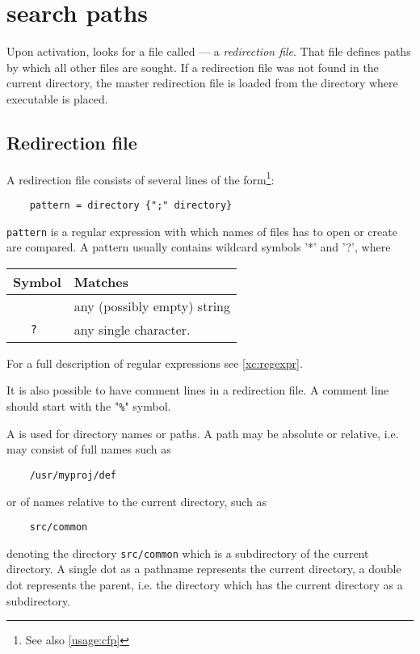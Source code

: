 \section{\XDS{} search paths}

Upon activation, \XC{} looks for a file called {\tt \red} ---
a {\em redirection file}. That file defines paths by which all
other files are sought. If a redirection file was not found in
the current directory, the master redirection file is loaded
from the directory where \XC{} executable is placed.

\subsection{Redirection file}\label{xc:red}

A redirection file consists of several lines
of the form\footnote{See also \ref{usage:cfp}}:

\verb'    pattern = directory {";" directory}'

{\tt pattern}
is a regular expression with which names of files \XC{} has to open
or create are compared. A pattern usually contains wildcard symbols '*'
and '?', where

\begin{tabular}{cl}
\bf Symbol & \bf Matches \\
\hline
\tt * & any (possibly empty) string \\
\tt ? & any single character.
\end{tabular}

For a full description of regular expressions see \ref{xc:regexpr}.

It is also possible to have comment lines in a redirection file.
A comment line should start with the "\verb'%'" symbol.

A  is used for directory names
or paths. A path may be absolute or relative, i.e. may consist  of
full names such as

\verb'    /usr/myproj/def'

or of names relative to the current directory, such as

\verb'    src/common'

denoting the directory \verb'src/common' which is a subdirectory of the
current directory. A single dot as a pathname represents the current
directory, a double dot represents the parent, i.e. the
directory which has the current directory as a
subdirectory.


